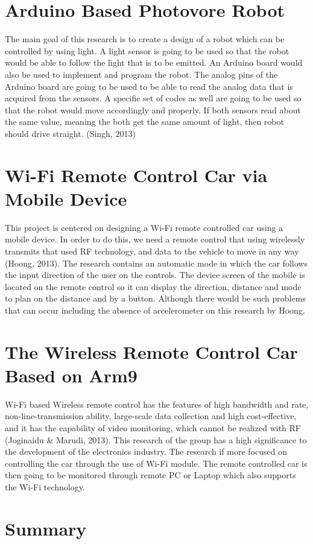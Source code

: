 \section{Arduino Based Photovore Robot}

The main goal of this research is to create a design of a robot which can be controlled by using light. A light sensor is going to be used so that the robot would be able to follow the light that is to be emitted. An Arduino board would also be used to implement and program the robot. The analog pins of the Arduino board are going to be used to be able to read the analog data that is acquired from the sensors. A specific set of codes as well are going to be used so that the robot would move accordingly and properly. If both sensors read about the same value, meaning the both get the same amount of light, then robot should drive straight. (Singh, 2013)



\section{Wi-Fi Remote Control Car via Mobile Device}



This project is centered on designing a Wi-Fi remote controlled car using a mobile device. In order to do this, we need a remote control that using wirelessly transmits that used RF technology, and data to the vehicle to move in any way (Hoong, 2013). The research contains an automatic mode in which the car follows the input direction of the user on the controls. The device screen of the mobile is located on the remote control so it can display the direction, distance and mode to plan on the distance and by a button. Although there would be such problems that can occur including the absence of accelerometer on this research by Hoong. 




\section{The Wireless Remote Control Car Based on Arm9}


Wi-Fi based Wireless remote control has the features of high bandwidth and rate, non-line-transmission ability, large-scale data collection and high cost-effective, and it has the capability of video monitoring, which cannot be realized with RF (Joginaidu & Marudi, 2013). This research of the group has a high significance to the development of the electronics industry. The research if more focused on controlling the car through the use of Wi-Fi module. The remote controlled car is then going to be monitored through remote PC or Laptop which also supports the Wi-Fi technology. 


\section{Summary}

